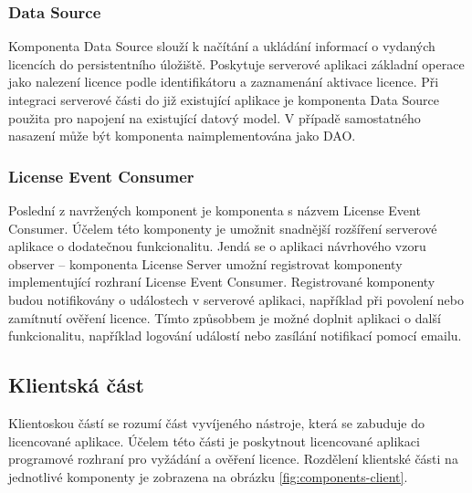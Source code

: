 \subsubsection*{Data Source}

Komponenta Data Source slouží k načítání a ukládání informací o vydaných
licencích do persistentního úložiště. Poskytuje serverové aplikaci základní operace jako
nalezení licence podle identifikátoru a zaznamenání aktivace licence. Při
integraci serverové části do již existující aplikace je komponenta Data Source
použita pro napojení na existující datový model. V případě samostatného nasazení
může být komponenta naimplementována jako \gls{DAO}.

\subsubsection*{License Event Consumer}

Poslední z navržených komponent je komponenta s názvem License Event Consumer. 
Účelem této komponenty je umožnit snadnější rozšíření serverové aplikace o
dodatečnou funkcionalitu. Jendá se o aplikaci návrhového vzoru observer –
komponenta License Server umožní registrovat komponenty implementující rozhraní
License Event Consumer. Registrované komponenty budou notifikovány o událostech
v serverové aplikaci, například při povolení nebo zamítnutí ověření licence.
Tímto způsobbem je možné doplnit aplikaci o další funkcionalitu, například
logování událostí nebo zasílání notifikací pomocí emailu.


\subsection{Klientská část}

Klientoskou částí se rozumí část vyvíjeného nástroje, která se zabuduje do
licencované aplikace. Účelem této části je poskytnout licencované aplikaci
programové rozhraní pro vyžádání a ověření licence. Rozdělení klientské části na
jednotlivé komponenty je zobrazena na obrázku \ref{fig:components-client}.

